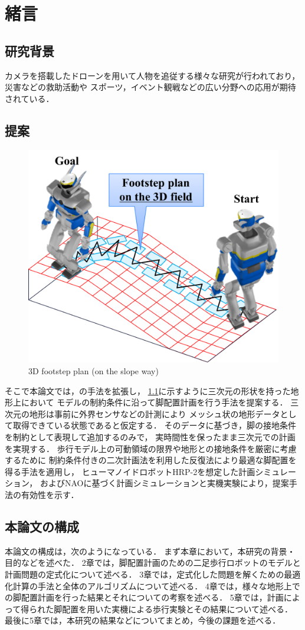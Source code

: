 \documentclass[autodetect-engine,dvipdfmx-if-dvi,ja=standard,a4j,jbase=11pt,magstyle=nomag*]{bxjsreport}
\begin{document}
\chapter{緒言}

\section{研究背景}

カメラを搭載したドローンを用いて人物を追従する様々な研究が行われており，災害などの救助活動や
スポーツ，イベント観戦などの広い分野への応用が期待されている．


\section{提案}
\begin{figure}[t]
    \centering
    \includegraphics[width=0.8\linewidth, clip]{./figure/concept.pdf}
    \caption{3D footstep plan (on the slope way)}
    \label{fig:concept}
\end{figure}

そこで本論文では，\cite{yao_2011rs}の手法を拡張し，
\cref{fig:concept}に示すように三次元の形状を持った地形上において
モデルの制約条件に沿って脚配置計画を行う手法を提案する．
三次元の地形は事前に外界センサなどの計測により
メッシュ状の地形データとして取得できている状態であると仮定する．
そのデータに基づき，脚の接地条件を制約として表現して追加するのみで，
実時間性を保ったまま三次元での計画を実現する．
歩行モデル上の可動領域の限界や地形との接地条件を厳密に考慮するために
制約条件付きの二次計画法を利用した反復法により最適な脚配置を得る手法を適用し，
ヒューマノイドロボットHRP-2\cite{isozumi_2004jrsj}を想定した計画シミュレーション，
およびNAO\cite{mao_official}に基づく計画シミュレーションと実機実験により，提案手法の有効性を示す．


\section{本論文の構成}
本論文の構成は，次のようになっている．
まず本章において，本研究の背景・目的などを述べた．
2章では，脚配置計画のための二足歩行ロボットのモデルと計画問題の定式化について述べる．
3章では，定式化した問題を解くための最適化計算の手法と全体のアルゴリズムについて述べる．
4章では，様々な地形上での脚配置計画を行った結果とそれについての考察を述べる．
5章では，計画によって得られた脚配置を用いた実機による歩行実験とその結果について述べる．
最後に5章では，本研究の結果などについてまとめ，今後の課題を述べる．
\end{document}
